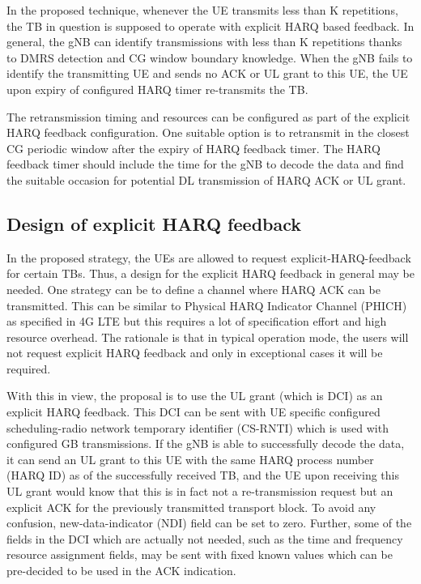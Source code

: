 \documentclass[conference]{IEEEtran}
\begin{document}
In the proposed technique, whenever the UE transmits less than K repetitions, the TB in question is supposed to operate with explicit HARQ based feedback. In general, the gNB can identify transmissions with less than K repetitions thanks to DMRS detection and CG window boundary knowledge. When the gNB fails to identify the transmitting UE and sends no ACK or UL grant to this UE, the UE upon expiry of configured HARQ timer re-transmits the TB. 

The retransmission timing and resources can be configured as part of the explicit HARQ feedback configuration. One suitable option is to retransmit in the closest CG periodic window after the expiry of HARQ feedback timer. The HARQ feedback timer should include the time for the gNB to decode the data and find the suitable occasion for potential DL transmission of HARQ ACK or UL grant.

\subsection{Design of explicit HARQ feedback}\label{IIBB}

In the proposed strategy, the UEs are allowed to request explicit-HARQ-feedback for certain TBs. Thus, a design for the explicit HARQ feedback in general may be needed. One strategy can be to define a channel where HARQ ACK can be transmitted. This can be similar to Physical HARQ Indicator Channel (PHICH) as specified in 4G LTE but this requires a lot of specification effort and high resource overhead. The rationale is that in typical operation mode, the users will not request explicit HARQ feedback and only in exceptional cases it will be required. 

With this in view, the proposal is to use the UL grant (which is DCI) as an explicit HARQ feedback. This DCI can be sent with UE specific configured scheduling-radio network temporary identifier (CS-RNTI) which is used with configured GB transmissions. If the gNB is able to successfully decode the data, it can send an UL grant to this UE with the same HARQ process number (HARQ ID) as of the successfully received TB, and the UE upon receiving this UL grant would know that this is in fact not a re-transmission request but an explicit ACK for the previously transmitted transport block. To avoid any confusion, new-data-indicator (NDI) field can be set to zero. Further, some of the fields in the DCI which are actually not needed, such as the time and frequency resource assignment fields, may be sent with fixed known values which can be pre-decided to be used in the ACK indication.
\end{document}
